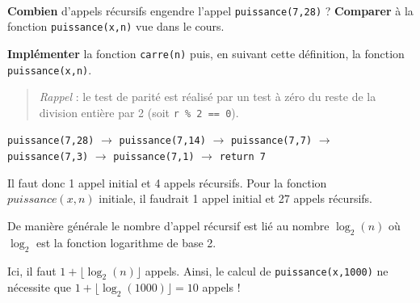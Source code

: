\documentclass[a4paper,17pt]{extarticle}
\newenvironment{eleve}%
{\begin{activite}\color{noiramu}\\[-0.5cm]}
{\end{activite}}
\begin{document}
\begin{eleve}
\textbf{Combien} d'appels récursifs engendre l'appel
\texttt{puissance(7,28)} ? \textbf{Comparer} à la fonction
\texttt{puissance(x,n)} vue dans le cours.

\textbf{Implémenter} la fonction \texttt{carre(n)} puis, en suivant
cette définition, la fonction \texttt{puissance(x,n)}.

\begin{quote}
\emph{Rappel} : le test de parité est réalisé par un test à zéro du
reste de la division entière par 2 (soit \texttt{r\ \%\ 2\ ==\ 0}).
\end{quote}
        
        \end{eleve}\begin{reponse}
    \texttt{puissance(7,28)} \(\rightarrow\) \texttt{puissance(7,14)}
\(\rightarrow\) \texttt{puissance(7,7)} \(\rightarrow\)
\texttt{puissance(7,3)} \(\rightarrow\) \texttt{puissance(7,1)}
\(\rightarrow\) \texttt{return\ 7}

Il faut donc 1 appel initial et 4 appels récursifs. Pour la fonction
\(puissance(x,n)\) initiale, il faudrait 1 appel initial et 27 appels
récursifs.

De manière générale le nombre d'appel récursif est lié au nombre
\(\log_2 (n)\) où \(\log_2\) est la fonction logarithme de base 2.

Ici, il faut \(1+\lfloor \log_2(n) \rfloor\) appels. Ainsi, le calcul de
\texttt{puissance(x,1000)} ne nécessite que
\(1+\lfloor \log_2 (1000) \rfloor = 10\) appels !

            \end{reponse}

    
    
    
\end{document}
